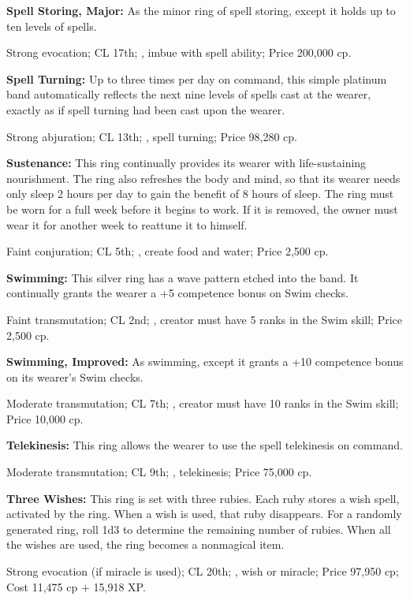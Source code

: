 \begin{itemize*}
\begin{itemize*}
\textbf{Spell Storing, Major:} As the minor ring of spell storing, except it holds up to ten levels of spells.

Strong evocation; CL 17th; , imbue with spell ability; Price 200,000 cp.

\textbf{Spell Turning:} Up to three times per day on command, this simple platinum band automatically reflects the next nine levels of spells cast at the wearer, exactly as if spell turning had been cast upon the wearer.

Strong abjuration; CL 13th; , spell turning; Price 98,280 cp.

\textbf{Sustenance:} This ring continually provides its wearer with life-sustaining nourishment. The ring also refreshes the body and mind, so that its wearer needs only sleep 2 hours per day to gain the benefit of 8 hours of sleep. The ring must be worn for a full week before it begins to work. If it is removed, the owner must wear it for another week to reattune it to himself.

Faint conjuration; CL 5th; , create food and water; Price 2,500 cp.

\textbf{Swimming:} This silver ring has a wave pattern etched into the band. It continually grants the wearer a +5 competence bonus on Swim checks.

Faint transmutation; CL 2nd; , creator must have 5 ranks in the Swim skill; Price 2,500 cp.

\textbf{Swimming, Improved:} As swimming, except it grants a +10 competence bonus on its wearer's Swim checks.

Moderate transmutation; CL 7th; , creator must have 10 ranks in the Swim skill; Price 10,000 cp.

\textbf{Telekinesis:} This ring allows the wearer to use the spell telekinesis on command.

Moderate transmutation; CL 9th; , telekinesis; Price 75,000 cp.

\textbf{Three Wishes:} This ring is set with three rubies. Each ruby stores a wish spell, activated by the ring. When a wish is used, that ruby disappears. For a randomly generated ring, roll 1d3 to determine the remaining number of rubies. When all the wishes are used, the ring becomes a nonmagical item.

Strong evocation (if miracle is used); CL 20th; , wish or miracle; Price 97,950 cp; Cost 11,475 cp + 15,918 XP.


\end{itemize*}
\end{itemize*}
